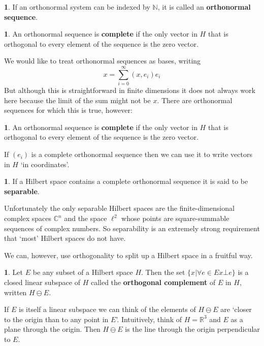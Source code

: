 \documentclass[oneside,english]{amsbook}
\numberwithin{section}{chapter}
\theoremstyle{plain}
\theoremstyle{definition}
\newtheorem{defn}[thm]{\protect\definitionname}
\providecommand{\definitionname}{Definition}
\begin{document}
\begin{defn}
	If an orthonormal system can be indexed by $\mathbb{N}$, it is called an \textbf{orthonormal sequence}.
\end{defn}

\begin{defn}
	An orthonormal sequence is \textbf{complete} if the only vector in $H$ that is orthogonal to every element of the sequence is the zero vector.
\end{defn}

We would like to treat orthonormal sequences as bases, writing
\[
	x = \sum_{i=0}^\infty (x, e_i)e_i
\]
But although this is straightforward in finite dimensions it does not always work here because the limit of the sum might not be $x$. There are orthonormal sequences for which this is true, however:

\begin{defn}
	An orthonormal sequence is \textbf{complete} if the only vector in $H$ that is orthogonal to every element of the sequence is the zero vector.
\end{defn}

If $(e_i)$ is a complete orthonormal sequence then we can use it to write vectors in $H$ `in coordinates'.

\begin{defn}
	If a Hilbert space contains a complete orthonormal sequence it is said to be \textbf{separable}.
\end{defn}

Unfortunately the only separable Hilbert spaces are the finite-dimensional complex spaces $\mathbb{C}^n$ and the space $\ell^2$ whose points are square-summable sequences of complex numbers. So separability is an extremely strong requirement that `most' Hilbert spaces do not have.

We can, however, use orthogonality to split up a Hilbert space in a fruitful way.

\begin{defn}
	Let $E$ be any subset of a Hilbert space $H$. Then the set $\{x | \forall e\in E x\bot e\}$ is a closed linear subspace of $H$ called the \textbf{orthogonal complement} of $E$ in $H$, written $H\ominus E$.
\end{defn}

If $E$ is itself a linear subspace we can think of the elements of $H\ominus E$ are `closer to the origin than to any point in $E$'. Intuitively, think of $H = \mathbb{R}^3$ and $E$ as a plane through the origin. Then $H\ominus E$ is the line through the origin perpendicular to $E$.
\end{document}
